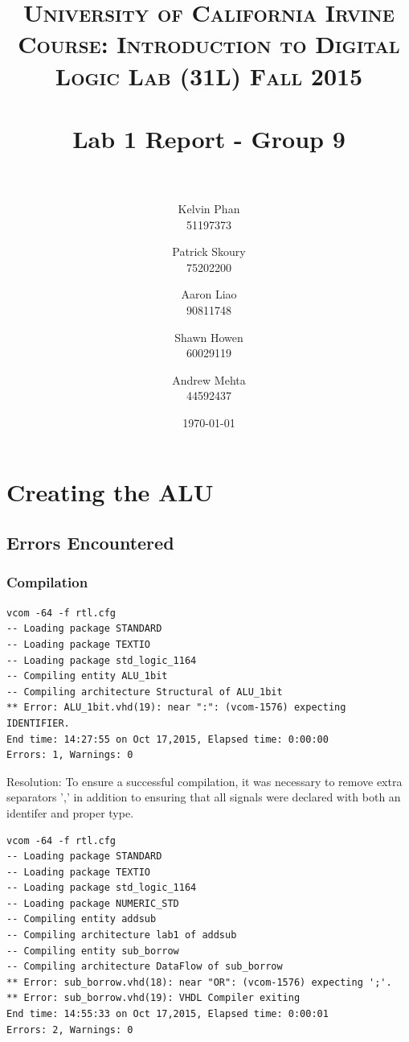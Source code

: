 \documentclass[paper=letter, fontsize=11pt]{scrartcl}
\title{	
\normalfont \normalsize 
\textsc{University of California Irvine} \\  %
\textsc{Course: Introduction to Digital Logic Lab (31L) Fall 2015} \\ [25pt]
\horrule{0.5pt} \\[0.4cm] %
\huge Lab 1 Report - Group 9\\ %
\horrule{2pt} \\[0.5cm] %
}
\author{Kelvin Phan \\ 51197373
	\and
	Patrick Skoury \\ 75202200
	\and
	Aaron Liao \\ 90811748
	\and
	Shawn Howen \\ 60029119
	\and
	Andrew Mehta \\ 44592437
}
\date{\large\today} %
\numberwithin{equation}{section} %
\numberwithin{figure}{section} %
\numberwithin{table}{section} %
\begin{document}
\maketitle %


\section{Creating the ALU}


\subsection{Errors Encountered}

\subsubsection{Compilation \\[20pt]} 

\begin{verbatim}
vcom -64 -f rtl.cfg
-- Loading package STANDARD
-- Loading package TEXTIO
-- Loading package std_logic_1164
-- Compiling entity ALU_1bit
-- Compiling architecture Structural of ALU_1bit
** Error: ALU_1bit.vhd(19): near ":": (vcom-1576) expecting IDENTIFIER.
End time: 14:27:55 on Oct 17,2015, Elapsed time: 0:00:00
Errors: 1, Warnings: 0
\end{verbatim}

Resolution: To ensure a successful compilation, it was necessary to remove extra separators ',' in addition to ensuring that all signals were declared with both an identifer and proper type. 

\begin{verbatim}
vcom -64 -f rtl.cfg
-- Loading package STANDARD
-- Loading package TEXTIO
-- Loading package std_logic_1164
-- Loading package NUMERIC_STD
-- Compiling entity addsub
-- Compiling architecture lab1 of addsub
-- Compiling entity sub_borrow
-- Compiling architecture DataFlow of sub_borrow
** Error: sub_borrow.vhd(18): near "OR": (vcom-1576) expecting ';'.
** Error: sub_borrow.vhd(19): VHDL Compiler exiting
End time: 14:55:33 on Oct 17,2015, Elapsed time: 0:00:01
Errors: 2, Warnings: 0
\end{verbatim}
\end{document}
